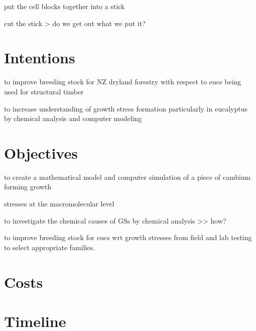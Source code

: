 \documentclass{article}
\begin{document}
put the cell blocks together into a stick

cut the stick > do we get out what we put it?

\section{Intentions}
to improve breeding stock for NZ dryland forestry with respect to eucs being used for structural timber

to increase understanding of growth stress formation particularly in eucalyptus
by chemical analysis and computer modeling

\section{Objectives}

to create a mathematical model and computer simulation of a piece of cambium forming growth

stresses at the macromolecular level

to investigate the chemical causes of GSs by chemical analysis >> how?

to improve breeding stock for eucs wrt growth stresses from field and lab testing to select appropriate families.

\section{Costs}

\section{Timeline}
\end{document}
